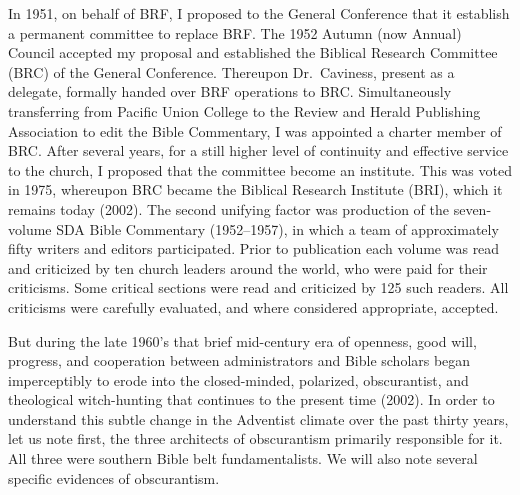 In 1951, on behalf of BRF, I proposed to the General Conference that it
establish a permanent committee to replace 
BRF.
The 1952 Autumn (now
Annual) Council accepted my proposal and established the Biblical Research
Committee (BRC) of the General Conference. Thereupon Dr.\ Caviness, present 
as a delegate, formally handed over BRF operations to BRC. Simultaneously
transferring from Pacific Union College to the Review and Herald Publishing
Association to edit the Bible Commentary, I was appointed a charter member
of BRC. After several years, for a still higher level of continuity and
effective service to the church, I proposed that the committee become an
institute. This was voted in 1975, whereupon BRC became the Biblical
Research Institute (BRI), which it remains today (2002).
\newpage
The second unifying factor was production of the seven-volume SDA Bible
Commentary (1952--1957), in which a team of approximately 
fifty writers and editors participated. Prior to 
publication each volume was read and
criticized by ten church leaders around the world, who were paid for their
criticisms. Some 
critical sections were read and criticized by 125 such
readers. All criticisms were carefully evaluated, and where considered
appropriate, accepted.

But during the late 1960's that brief mid-century era of openness, good
will, progress, and cooperation between administrators and Bible scholars
began imperceptibly to erode into the closed-minded, polarized,
obscurantist, and theological witch-hunting that continues to the present
time (2002). In order to understand this subtle change in the Adventist
climate over the past thirty years, let us note first, the three architects
of obscurantism primarily responsible for it. All three were southern Bible
belt fundamentalists. We will also note several specific evidences of
obscurantism.

